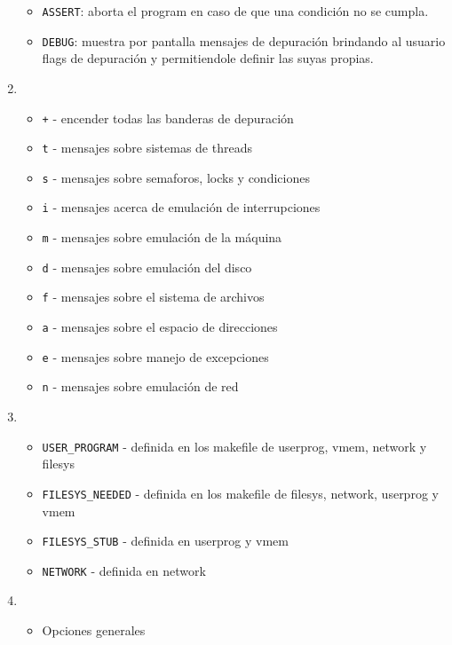 \documentclass[11pt]{article}
\begin{document}
\begin{enumerate}
\begin{itemize}
            \item \texttt{ASSERT}: aborta el program en caso de que una condición
                  no se cumpla.
            \item \texttt{DEBUG}: muestra por pantalla mensajes de depuración 
                  brindando al usuario flags de depuración y permitiendole definir las suyas propias.
        \end{itemize}
    \item
        \begin{itemize}
            \item \; \texttt{+} \;-\; encender todas las banderas de depuración
            \item \; \texttt{t} \;-\; mensajes sobre sistemas de threads
            \item \; \texttt{s} \;-\; mensajes sobre semaforos, locks y condiciones
            \item \; \texttt{i} \;-\; mensajes acerca de emulación de interrupciones
            \item \; \texttt{m} \;-\; mensajes sobre emulación de la máquina
            \item \; \texttt{d} \;-\; mensajes sobre emulación del disco
            \item \; \texttt{f} \;-\; mensajes sobre el sistema de archivos
            \item \; \texttt{a} \;-\; mensajes sobre el espacio de direcciones
            \item \; \texttt{e} \;-\; mensajes sobre manejo de excepciones
            \item \; \texttt{n} \;-\; mensajes sobre emulación de red
        \end{itemize}
    \item
        \begin{itemize}
            \item \texttt{USER\_PROGRAM} - definida en los makefile de userprog, vmem, network y filesys
            \item \texttt{FILESYS\_NEEDED} - definida en los makefile de filesys, network, userprog y vmem
            \item \texttt{FILESYS\_STUB} - definida en userprog y vmem
            \item \texttt{NETWORK} - definida en network
        \end{itemize}
    \item
        \begin{itemize}
            \item Opciones generales

\end{itemize}
\end{enumerate}
\end{document}
